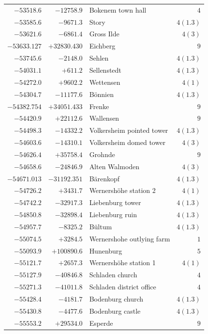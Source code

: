 \begin{center}
\begin{tabular}{r|r|p{170pt}|r}
\(-53518.6\)&\(-12758.9\)&Bokenem town hall&\(4\)\\
\(-53585.6\)&\(-9671.3\)&Story&\(4(1.3)\)\\
\(-53621.6\)&\(-6861.4\)&Gross Ilde&\(4 (3)\)\\
\(-53633.127\)&\(+32830.430\)&Eichberg&\(9\)\\
\(-53745.6\)&\(-2148.0\)&Sehlen&\(4(1.3)\)\\
\(-54031.1\)&\(+611.2\)&Sellenstedt&\(4(1.3)\)\\
\(-54272.0\)&\(+9602.2\)&Wettensen&\(4 (1)\)\\
\(-54304.7\)&\(-11177.6\)&Bönnien&\(4(1.3)\)\\
\(-54382.754\)&\(+34051.433\)&Frenke&\(9\)\\
\(-54420.9\)&\(+22112.6\)&Wallensen&\(9\)\\
\(-54498.3\)&\(-14332.2\)&Volkersheim pointed tower&\(4(1.3)\)\\
\(-54603.6\)&\(-14310.1\)&Volkersheim domed tower&\(4 (3)\)\\
\(-54626.4\)&\(+35758.4\)&Grohnde&\(9\)\\
\(-54658.6\)&\(-24846.9\)&Alten Walmoden&\(4(3)\)\\
\(-54671.013\)&\(-31192.351\)&Bärenkopf&\(4(1.3)\)\\
\(-54726.2\)&\(+3431.7\)&Wernershöhe station 2&\(4 (1)\)\\
\(-54742.2\)&\(-32917.3\)&Liebenburg tower&\(4(1.3)\)\\
\(-54850.8\)&\(-32898.4\)&Liebenburg ruin&\(4(1.3)\)\\
\(-54957.7\)&\(-8325.2\)&Bültum&\(4(1.3)\)\\
\(-55074.5\)&\(+3284.5\)&Wernershohe outlying farm&\(1\)\\
\(-55093.9\)&\(+100890.6\)&Hunenburg&\(5\)\\
\(-55121.7\)&\(+2657.3\)&Wernershöhe station 1&\(4(1)\)\\
\(-55127.9\)&\(-40846.8\)&Schladen church&\(4\)\\
\(-55271.3\)&\(-41011.8\)&Schladen district office&\(4\)\\
\(-55428.4\)&\(-4181.7\)&Bodenburg church&\(4(1.3)\)\\
\(-55430.8\)&\(-4477.6\)&Bodenburg castle&\(4(1.3)\)\\
\(-55553.2\)&\(+29534.0\)&Esperde&\(9\)\\
\hline\end{tabular}\endgroup\end{center}
